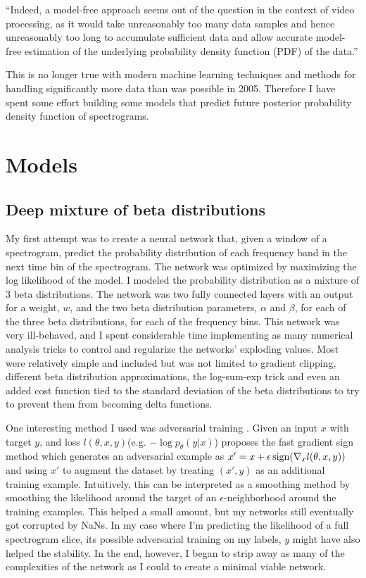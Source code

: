 
``Indeed, a model-free approach seems out of the question in the context of video processing, as it would take unreasonably too many data samples and hence unreasonably too long to accumulate sufficient data and allow accurate model-free estimation of the underlying probability density function (PDF) of the data.'' \cite{itti2005principled}

This is no longer true with modern machine learning techniques and methods for handling significantly more data than was possible in 2005. Therefore I have spent some effort building some models that predict future posterior probability density function of spectrograms.

\section{Models}

\subsection{Deep mixture of beta distributions}
My first attempt was to create a neural network that, given a window of a spectrogram, predict the probability distribution of each frequency band in the next time bin of the spectrogram. The network was optimized by maximizing the log likelihood of the model. I modeled the probability distribution as a mixture of 3 beta distributions. The network was two fully connected layers with an output for a weight, $w$, and the two beta distribution parameters, $\alpha$ and $\beta$, for each of the three beta distributions, for each of the frequency bins. This network was very ill-behaved, and I spent considerable time implementing as many numerical analysis tricks to control and regularize the networks' exploding values. Most were relatively simple and included but was not limited to gradient clipping, different beta distribution approximations, the log-sum-exp trick and even an added cost function tied to the standard deviation of the beta distributions to try to prevent them from becoming delta functions.

One interesting method I used was adversarial training \cite{goodfellow2014explaining,lakshminarayanan2017simple}. Given an input $x$ with target $y$, and loss $l(\theta, x, y)$(e.g. $-\log p_\theta(y|x)$) \cite{goodfellow2014explaining} proposes the fast gradient sign method which generates an adversarial example as $x' = x + \epsilon \operatorname{sign}(\nabla_x l(\theta, x, y))$ and using $x'$ to augment the dataset by treating $(x', y)$ as an additional training example. Intuitively, this can be interpreted as a smoothing method by smoothing the likelihood around the target of an $\epsilon$-neighborhood around the training examples. This helped a small amount, but my networks still eventually got corrupted by NaNs. In my case where I'm predicting the likelihood of a full spectrogram slice, its possible adversarial training on my labels, $y$ might have also helped the stability. In the end, however, I began to strip away as many of the complexities of the network as I could to create a minimal viable network.

